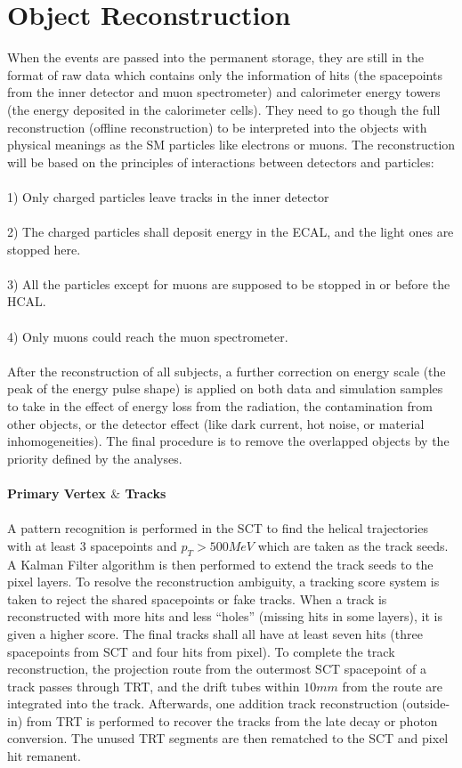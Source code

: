 \section{Object Reconstruction}
\label{sec:obj rec}
When the events are passed into the permanent storage, they are still in the format of raw data which contains only the information of hits (the spacepoints from the inner detector and muon spectrometer) and calorimeter energy towers (the energy deposited in the calorimeter cells). They need to go though the full reconstruction (offline reconstruction) to be interpreted into the objects with physical meanings as the SM particles like electrons or muons. The reconstruction will be based on the principles of interactions between detectors and particles: 
\\
\\1) Only charged particles leave tracks in the inner detector
\\
\\2) The charged particles shall deposit energy in the ECAL, and the light ones are stopped here.
\\
\\3) All the particles except for muons are supposed to be stopped in or before the HCAL.
\\
\\4) Only muons could reach the muon spectrometer. 
\\
\\After the reconstruction of all subjects, a further correction on energy scale (the peak of the energy pulse shape) is applied on both data and simulation samples to take in  the effect of energy loss from the radiation, the contamination from other objects, or the detector effect (like dark current, hot noise, or material inhomogeneities). The final procedure is to remove the overlapped objects by the priority defined by the analyses. 
\\
\\{\bf Primary Vertex $\&$ Tracks}
\\
\\A pattern recognition is performed in the SCT to find the helical trajectories with at least 3 spacepoints and $p_{T}>500MeV$ which are taken as the track seeds. A Kalman Filter algorithm is then performed to extend the track seeds to the pixel layers. To resolve the reconstruction ambiguity, a tracking score system is taken to reject the shared spacepoints or fake tracks. When a track is reconstructed with more hits and less ``holes'' (missing hits in some layers), it is given a higher score. The final tracks shall all have at least seven hits (three spacepoints from SCT and four hits from pixel). To complete the track reconstruction, the projection route from the outermost SCT spacepoint of a track passes through TRT, and the drift tubes within $10mm$ from the route are integrated into the track. Afterwards, one addition track reconstruction (outside-in) from TRT is performed to recover the tracks from the late decay or photon conversion. The unused TRT segments are then rematched to the SCT and pixel hit remanent.   
